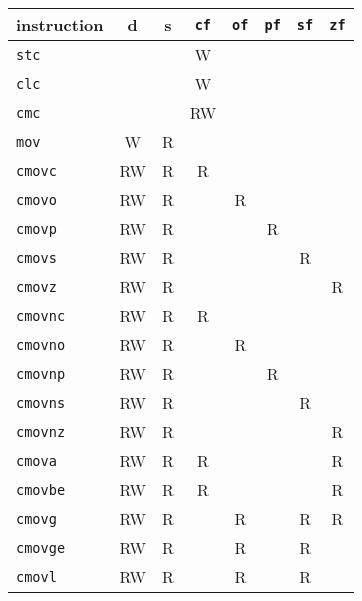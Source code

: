 \documentclass[a4paper,11pt]{kth-mag}
\begin{document}
\begin{table}
\centering
\tiny
\begin{tabular}{l|cc|ccccc}
instruction   & d  & s  & \verb|cf| & \verb|of| & \verb|pf| & \verb|sf| & \verb|zf| \\
\hline
\verb|stc|    &    &    & W         &           &           &           &           \\
\verb|clc|    &    &    & W         &           &           &           &           \\
\verb|cmc|    &    &    & RW        &           &           &           &           \\
\hline
\verb|mov|    & W  & R  &           &           &           &           &           \\
\verb|cmovc|  & RW & R  & R         &           &           &           &           \\
\verb|cmovo|  & RW & R  &           & R         &           &           &           \\
\verb|cmovp|  & RW & R  &           &           & R         &           &           \\
\verb|cmovs|  & RW & R  &           &           &           & R         &           \\
\verb|cmovz|  & RW & R  &           &           &           &           & R         \\
\verb|cmovnc| & RW & R  & R         &           &           &           &           \\
\verb|cmovno| & RW & R  &           & R         &           &           &           \\
\verb|cmovnp| & RW & R  &           &           & R         &           &           \\
\verb|cmovns| & RW & R  &           &           &           & R         &           \\
\verb|cmovnz| & RW & R  &           &           &           &           & R         \\
\verb|cmova|  & RW & R  & R         &           &           &           & R         \\
\verb|cmovbe| & RW & R  & R         &           &           &           & R         \\
\verb|cmovg|  & RW & R  &           & R         &           & R         & R         \\
\verb|cmovge| & RW & R  &           & R         &           & R         &           \\
\verb|cmovl|  & RW & R  &           & R         &           & R         &           \\

\end{tabular}
\end{table}
\end{document}
